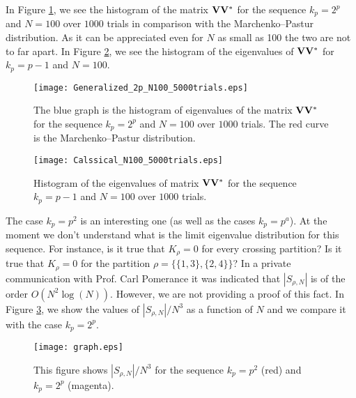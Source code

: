 \documentclass[smallextended]{svjour3}
\begin{document}
In Figure \ref{MP}, we see the histogram of the matrix $\bf{V}\bf{V}^{*}$ for the sequence $k_p=2^{p}$ and $N=100$ over $1000$ trials in comparison with the Marchenko--Pastur distribution. As it can be appreciated even for $N$ as small as 100 the two are not to far apart. In Figure \ref{classic}, we see the histogram of the eigenvalues of $\bf{V}\bf{V}^{*}$ for $k_p=p-1$ and $N=100$.
\begin{figure}[!Ht]
  \begin{center}
    \texttt{[image: Generalized\_2p\_N100\_5000trials.eps]}
    \caption{The blue graph is the histogram of eigenvalues of the matrix $\bf{V}\bf{V}^{*}$ for the sequence $k_p=2^{p}$ and $N=100$ over $1000$ trials. The red curve is the Marchenko--Pastur distribution.}
    \label{MP}
  \end{center}
\end{figure}
\begin{figure}[!Ht]
  \begin{center}
    \texttt{[image: Calssical\_N100\_5000trials.eps]}
    \caption{Histogram of the eigenvalues of matrix $\bf{V}\bf{V}^{*}$ for the sequence $k_p=p-1$ and $N=100$ over $1000$ trials.}
    \label{classic}
  \end{center}
\end{figure}
The case $k_{p}=p^2$ is an interesting one (as well as the cases $k_{p}=p^{a}$). At the moment we don't understand what is the limit eigenvalue distribution for this sequence. For instance, is it true that $K_{\rho}=0$ for every crossing partition? Is it true that $K_{\rho}=0$ for the partition $\rho=\{\{1,3\},\{2,4\}\}$? In a private communication with Prof. Carl Pomerance it was indicated that $|S_{\rho,N}|$ is of the order $O(N^2\log(N))$. However, we are not providing a proof of this fact. In Figure \ref{ffg}, we show the values of $|S_{\rho,N}|/N^3$ as a function of $N$ and we compare it with the case $k_{p}=2^{p}$. 
\begin{figure}[!Ht]
  \begin{center}
    \texttt{[image: graph.eps]}
    \caption{This figure shows $|S_{\rho,N}|/N^3$ for the sequence $k_{p}=p^2$ (red) and $k_{p}=2^{p}$ (magenta).}
    \label{ffg}
  \end{center}
\end{figure}
\end{document}
